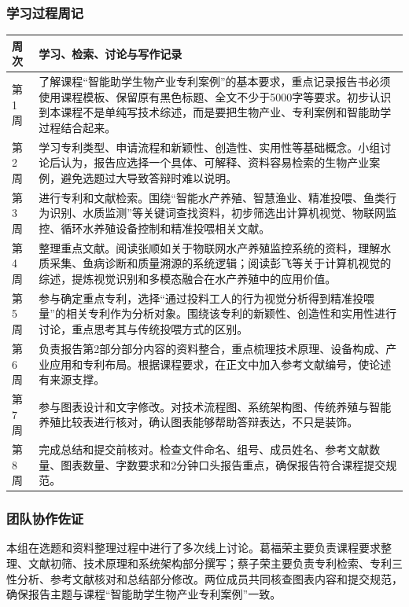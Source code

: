 \documentclass[UTF8,zihao=-4]{ctexart}
\begin{document}
	\subsubsection*{学习过程周记}
	\begin{longtable}{p{2.2cm}p{11.2cm}}
		\toprule
		周次 & 学习、检索、讨论与写作记录 \\
		\midrule
		第1周 & 了解课程“智能助学生物产业专利案例”的基本要求，重点记录报告书必须使用课程模板、保留原有黑色标题、全文不少于5000字等要求。初步认识到本课程不是单纯写技术综述，而是要把生物产业、专利案例和智能助学过程结合起来。 \\
		第2周 & 学习专利类型、申请流程和新颖性、创造性、实用性等基础概念。小组讨论后认为，报告应选择一个具体、可解释、资料容易检索的生物产业案例，避免选题过大导致答辩时难以说明。 \\
		第3周 & 进行专利和文献检索。围绕“智能水产养殖、智慧渔业、精准投喂、鱼类行为识别、水质监测”等关键词查找资料，初步筛选出计算机视觉、物联网监控、循环水养殖设备控制和精准投喂相关文献。 \\
		第4周 & 整理重点文献。阅读张顺如关于物联网水产养殖监控系统的资料，理解水质采集、鱼病诊断和质量溯源的系统逻辑；阅读彭飞等关于计算机视觉的综述，提炼视觉识别和多模态融合在水产养殖中的应用价值。 \\
		第5周 & 参与确定重点专利，选择“通过投料工人的行为视觉分析得到精准投喂量”的相关专利作为分析对象。围绕该专利的新颖性、创造性和实用性进行讨论，重点思考其与传统投喂方式的区别。 \\
		第6周 & 负责报告第2部分部分内容的资料整合，重点梳理技术原理、设备构成、产业应用和专利布局。根据课程要求，在正文中加入参考文献编号，使论述有来源支撑。 \\
		第7周 & 参与图表设计和文字修改。对技术流程图、系统架构图、传统养殖与智能养殖比较表进行核对，确认图表能够帮助答辩表达，不只是装饰。 \\
		第8周 & 完成总结和提交前核对。检查文件命名、组号、成员姓名、参考文献数量、图表数量、字数要求和2分钟口头报告重点，确保报告符合课程提交规范。 \\
		\bottomrule
	\end{longtable}
	
	\subsubsection*{团队协作佐证}
	本组在选题和资料整理过程中进行了多次线上讨论。葛福荣主要负责课程要求整理、文献初筛、技术原理和系统架构部分撰写；蔡子荣主要负责专利检索、专利三性分析、参考文献核对和总结部分修改。两位成员共同核查图表内容和提交规范，确保报告主题与课程“智能助学生物产业专利案例”一致。
	
\end{document}
